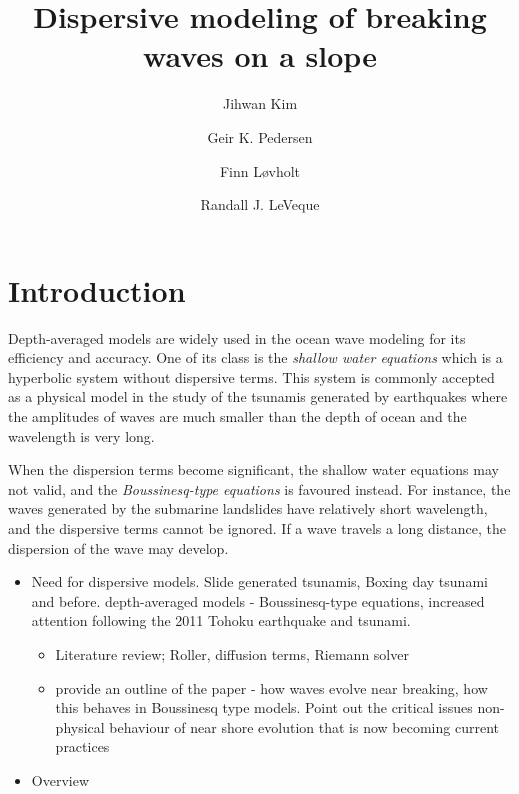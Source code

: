 \documentclass[review]{elsarticle}
\begin{document}
\begin{frontmatter}

\title{Dispersive modeling of breaking waves  on a slope}

\author[1]{Jihwan Kim}
\author[1]{Geir K. Pedersen}
\author[1,2]{Finn L{\o}vholt}
\author[3]{Randall J. LeVeque}

\address[1]{University of Oslo, Department of Mathematics, 
Oslo, Norway}
\address[2]{Norwegian Geotechnical Institute,
Oslo, Norway}
\address[3]{University of Washington, Department of Applied Mathematics, Seattle, USA}

\begin{abstract}

\end{abstract}

\begin{keyword}

\end{keyword}

\end{frontmatter}

\linenumbers

\section{Introduction}

\iffalse

Depth-averaged models are widely used
in the ocean wave modeling for its efficiency and accuracy. 
One of its class is the {\em shallow water equations}
which is a hyperbolic system without dispersive terms. 
This system is commonly accepted as a physical model
in the study of the tsunamis generated by earthquakes
where the amplitudes of waves are much smaller than the depth of ocean and the wavelength is very long. 

When the dispersion terms become significant,
the shallow water equations may not valid,
and the {\em Boussinesq-type equations} is favoured instead.
For instance, the waves generated by the submarine landslides
have relatively short wavelength,
and the dispersive terms cannot be ignored. 
If a wave travels a long distance, 
the dispersion of the wave may develop.  

\begin{itemize}
    \item Need for dispersive models. Slide generated tsunamis, Boxing day tsunami and before. depth-averaged models - Boussinesq-type equations, increased attention following the 2011 Tohoku earthquake and tsunami.
    \begin{itemize}
        \item Literature review; Roller, diffusion terms, Riemann solver
        \item provide an outline of the paper - how waves evolve near breaking, how this behaves in Boussinesq type models. Point out the critical issues non-physical behaviour of near shore evolution that is now becoming current practices
    \end{itemize}
    \item Overview 
\end{itemize}
\end{document}

